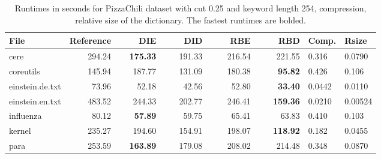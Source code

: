 \documentclass[english,twoside,censored,csm,algorithms-track-2020]{HYthesisML}
\theoremstyle{plain}
\theoremstyle{definition}
\numberwithin{testexample}{chapter}
\begin{document}
\begin{center}
  \begin{table}
  \begin{tabular} {| l |r r r r r|l l|}
    \hline
    \textbf{File} & \textbf{Reference} & ~~~~\textbf{DIE} & ~~~~\textbf{DID} & ~~~~\textbf{RBE} & ~~~~\textbf{RBD} & \textbf{Comp.} & \textbf{Rsize} \\
    \hline
    cere & 294.24 & \textbf{175.33} & 191.33 & 216.54 & 221.55            & 0.316  & 0.0790  \\
    coreutils & 145.94 & 187.77 & 131.09 & 180.38 & \textbf{95.82}        & 0.426  & 0.106   \\
    einstein.de.txt & 73.96 & 52.18 & 42.56 & 52.80 & \textbf{33.40}      & 0.0442 & 0.0110  \\
    einstein.en.txt & 483.52 & 244.33 & 202.77 & 246.41 & \textbf{159.36} & 0.0210 & 0.00524 \\
    influenza & 80.12 & \textbf{57.89} & 59.75 & 65.41 & 63.83            & 0.410  & 0.103   \\
    kernel & 235.27 & 194.60 & 154.91 & 198.07 & \textbf{118.92}          & 0.182  & 0.0455  \\
    para & 253.59 & \textbf{163.89} & 179.08 & 208.02 & 214.48            & 0.348  & 0.0870  \\
    \hline
  \end{tabular}
  \caption{Runtimes in seconds for PizzaChili dataset with cut 0.25 and keyword length 254, compression, relative size of the dictionary. The fastest runtimes are bolded.}
  \label{runtimes-25-254}
  \end{table}
\end{center}
\end{document}
